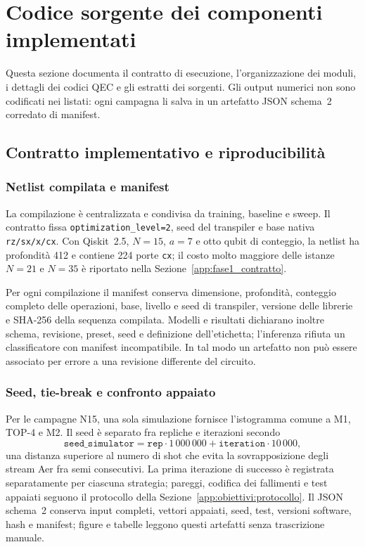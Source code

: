 \section{Codice sorgente dei componenti implementati}
\label{app:codice}

\begin{onehalfspace}

Questa sezione documenta il contratto di esecuzione, l'organizzazione dei moduli, i
dettagli dei codici QEC e gli estratti dei sorgenti. Gli output numerici non sono codificati
nei listati: ogni campagna li salva in un artefatto JSON schema~2 corredato di manifest.

\subsection{Contratto implementativo e riproducibilità}
\label{app:contratto_codice}

\subsubsection{Netlist compilata e manifest}
\label{app:netlist_manifest}

La compilazione è centralizzata e condivisa da training, baseline e sweep. Il contratto
fissa \texttt{optimization\_level=2}, seed del transpiler e base nativa
\texttt{rz/sx/x/cx}. Con Qiskit~2.5, $N=15$, $a=7$ e otto qubit di conteggio, la
netlist ha profondità 412 e contiene 224 porte \texttt{cx}; il costo molto maggiore
delle istanze $N=21$ e $N=35$ è riportato nella Sezione~\ref{app:fase1_contratto}.

Per ogni compilazione il manifest conserva dimensione, profondità, conteggio completo
delle operazioni, base, livello e seed di transpiler, versione delle librerie e SHA-256
della sequenza compilata. Modelli e risultati dichiarano inoltre schema, revisione,
preset, seed e definizione dell'etichetta; l'inferenza rifiuta un classificatore con
manifest incompatibile. In tal modo un artefatto non può essere associato per errore a
una revisione differente del circuito.

\subsubsection{Seed, tie-break e confronto appaiato}

Per le campagne N15, una sola simulazione fornisce l'istogramma comune a M1, TOP-4 e M2.
Il seed è separato fra repliche e iterazioni secondo
\begin{equation}
\texttt{seed\_simulator}=\texttt{rep}\cdot1\,000\,000+
\texttt{iteration}\cdot10\,000,
\end{equation}
una distanza superiore al numero di shot che evita la sovrapposizione degli stream
Aer fra semi consecutivi. La prima iterazione di successo è registrata separatamente per
ciascuna strategia; pareggi, codifica dei fallimenti e test appaiati seguono il protocollo
della Sezione~\ref{app:obiettivi:protocollo}. Il JSON schema~2 conserva input completi,
vettori appaiati, seed, test, versioni software, hash e manifest; figure e tabelle
leggono questi artefatti senza trascrizione manuale.


\end{onehalfspace}
